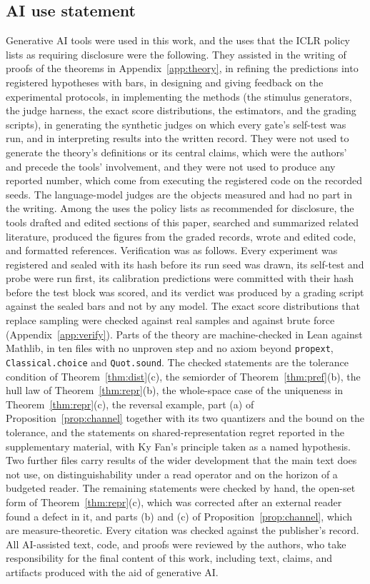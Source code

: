 \documentclass{article}
\theoremstyle{definition}
\theoremstyle{remark}
\newif\ifcornerstone
\begin{document}
\subsection*{AI use statement}
Generative AI tools were used in this work, and the uses that the ICLR policy lists as requiring disclosure were the following.
They assisted in the writing of proofs of the theorems in Appendix~\ref{app:theory}, in refining the predictions into registered hypotheses with bars, in designing and giving feedback on the experimental protocols, in implementing the methods (the stimulus generators, the judge harness, the exact score distributions, the estimators, and the grading scripts), in generating the synthetic judges on which every gate's self-test was run, and in interpreting results into the written record.
They were not used to generate the theory's definitions or its central claims, which were the authors' and precede the tools' involvement, and they were not used to produce any reported number, which come from executing the registered code on the recorded seeds.
The language-model judges are the objects measured and had no part in the writing.
Among the uses the policy lists as recommended for disclosure, the tools drafted and edited sections of this paper, searched and summarized related literature, produced the figures from the graded records, wrote and edited code, and formatted references.
Verification was as follows.
Every experiment was registered and sealed with its hash before its run seed was drawn, its self-test and probe were run first, its calibration predictions were committed with their hash before the test block was scored, and its verdict was produced by a grading script against the sealed bars and not by any model.
The exact score distributions that replace sampling were checked against real samples and against brute force (Appendix~\ref{app:verify}).
Parts of the theory are machine-checked in Lean against Mathlib, in ten files with no unproven step and no axiom beyond \texttt{propext}, \texttt{Classical.choice} and \texttt{Quot.sound}. The checked statements are the tolerance condition of Theorem~\ref{thm:dist}(c), the semiorder of Theorem~\ref{thm:pref}(b), the hull law of Theorem~\ref{thm:repr}(b), the whole-space case of the uniqueness in Theorem~\ref{thm:repr}(c), the reversal example, part (a) of Proposition~\ref{prop:channel} together with its two quantizers and the bound on the tolerance, and the statements on shared-representation regret\ifcornerstone{} in Appendix~\ref{app:gates}\else{} reported in the supplementary material\fi, with Ky Fan's principle taken as a named hypothesis. Two further files carry results of the wider development that the main text does not use, on distinguishability under a read operator and on the horizon of a budgeted reader.
The remaining statements were checked by hand, the open-set form of Theorem~\ref{thm:repr}(c), which was corrected after an external reader found a defect in it, and parts (b) and (c) of Proposition~\ref{prop:channel}, which are measure-theoretic.
Every citation was checked against the publisher's record.
All AI-assisted text, code, and proofs were reviewed by the authors, who take responsibility for the final content of this work, including text, claims, and artifacts produced with the aid of generative AI.
\end{document}
